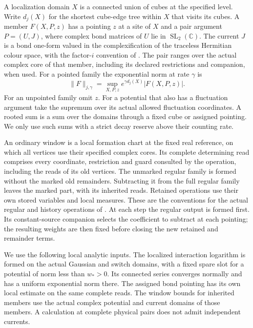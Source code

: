 \documentclass[11pt,letterpaper,reqno]{amsart}
\numberwithin{equation}{section}
\theoremstyle{definition}
\theoremstyle{remark}
\begin{document}
A localization domain $X$ is a connected union of cubes at the
specified level. Write $d_j(X)$ for the shortest cube-edge tree
within $X$ that visits its cubes. A member $F(X,P,z)$ has a
pointing $z$ at a site of $X$ and a pair argument $P=(U,J)$,
where complex bond matrices of $U$ lie in $\operatorname{SL}_2(\mathbb C)$.
The current $J$ is a bond one-form valued in the complexification
of the traceless Hermitian colour space, with the factor-$i$
convention of \cite{EM}. The pair ranges over the actual
complex core of that member, including its declared restrictions
and companion, when used. For a pointed family the exponential
norm at rate $\gamma$ is
\[
    \|F\|_{j,\gamma}
       =\sup_{X,P,z} e^{\gamma d_j(X)}|F(X,P,z)|.
\]
For an unpointed family omit $z$. For a potential that also has
a fluctuation argument take the supremum over its actual allowed
fluctuation coordinates. A rooted sum is a sum over the domains
through a fixed cube or assigned pointing. We only use such sums
with a strict decay reserve above their counting rate.

An ordinary window is a local formation chart at the fixed real
reference, on which all vertices use their specified complex
cores. Its complete determining read comprises every coordinate,
restriction and guard consulted by the operation, including the
reads of its old vertices. The unmarked regular family is formed
without the marked old remainders. Subtracting it from the full
regular family leaves the marked part, with its inherited reads.
Retained operations use their own stored variables and local
measures. These are the conventions for the actual regular and
history operations of \cite{EM,RT}.
At each step the regular output is formed first. Its constant-source
companion selects the coefficient to subtract at each pointing;
the resulting weights are then fixed before closing the new retained
and remainder terms.

We use the following local analytic inputs. The localized
interaction logarithm is formed on the actual Gaussian and
switch domains, with a fixed spare slot for a potential of norm
less than $w_*>0$. Its connected series converges normally and
has a uniform exponential norm there. The assigned bond
pointing has its own local estimate on the same complete reads.
The window bounds for inherited members use the actual complex
potential and current domains of those members. A calculation
at complete physical pairs does not admit independent currents.
\end{document}
